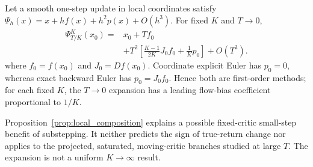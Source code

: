 \begin{proposition}
\label{prop:local_composition}
Let a smooth one-step update in local coordinates satisfy
$\Psi_h(x)=x+h f(x)+h^2p(x)+O(h^3)$. For fixed $K$ and $T\rightarrow0$,
\begin{equation}
\begin{aligned}
\Psi_{T/K}^{K}(x_0)
={}&x_0+Tf_0\\
&+T^2\!\left[\frac{K-1}{2K}J_0f_0+\frac{1}{K}p_0\right]
+O(T^3).
\end{aligned}
\label{eq:k_comp}
\end{equation}
where $f_0=f(x_0)$ and $J_0=Df(x_0)$. Coordinate explicit Euler has
$p_0=0$, whereas exact backward Euler has $p_0=J_0f_0$. Hence both are
first-order methods; for each fixed $K$, the $T\to0$ expansion has a leading
flow-bias coefficient proportional to $1/K$.
\end{proposition}

Proposition~\ref{prop:local_composition} explains a possible fixed-critic
small-step benefit of substepping. It neither predicts the sign of true-return
change nor applies to the projected, saturated, moving-critic branches studied
at large $T$. The expansion is not a uniform $K\to\infty$ result.
